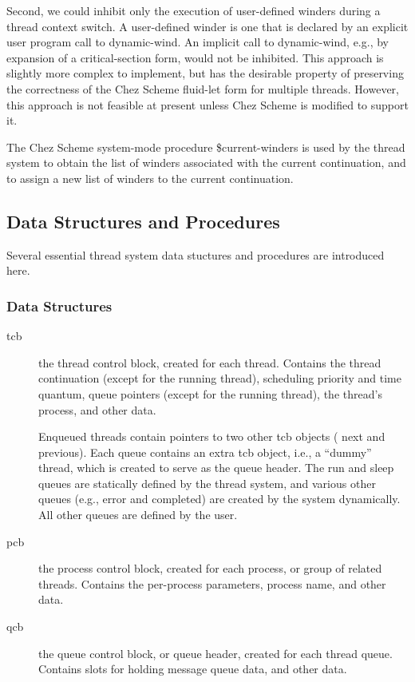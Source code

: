 \documentclass{article}
\begin{document}
Second, we could inhibit only the execution of user-defined winders
during a thread context switch.  A user-defined winder is one that is
declared by an explicit user program call to {\sf dynamic-wind}.  An
implicit call to {\sf dynamic-wind}, e.g., by expansion of a {\sf
critical-section} form, would not be inhibited.  This approach is
slightly more complex to implement, but has the desirable property of
preserving the correctness of the Chez Scheme {\sf fluid-let} form for
multiple threads.  However, this approach is not feasible at present
unless Chez Scheme is modified to support it.

The Chez Scheme system-mode procedure \$current-winders is used by the
thread system to obtain the list of winders associated with the
current continuation, and to assign a new list of winders to the
current continuation.


\subsection{Data Structures and Procedures}

Several essential thread system data stuctures and procedures are 
introduced here.

\subsubsection{Data Structures}
\begin{description}

\item[\sf tcb] the thread control block, created for each thread.
Contains the thread continuation (except for the running thread),
scheduling priority and time quantum, queue pointers (except for 
the running thread), the thread's process, and other data.

Enqueued threads contain pointers to two other {\sf tcb} objects ({\sf
next} and {\sf previous}). Each queue contains an extra {\sf tcb}
object, i.e., a ``dummy'' thread, which is created to serve as the
queue header. The {\sf run} and {\sf sleep} queues are statically
defined by the thread system, and various other queues (e.g., {\sf
error} and {\sf completed}) are created by the system dynamically. All
other queues are defined by the user.

\item[\sf pcb] the process control block, created for each
process, or group of related threads.  Contains the per-process
parameters, process name, and other data.

\item[\sf qcb] the queue control block, or queue header, created for each
thread queue. Contains slots for holding message queue data, and other
data.  

\end{description}
\end{document}
